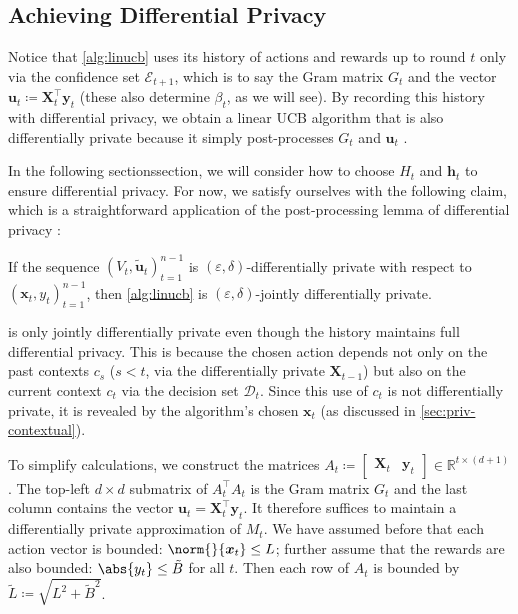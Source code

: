 \documentclass{article}
\renewcommand{\vec}[1]{\bm{#1}}
\newcommand{\defeq}{\coloneq}
\newcommand{\Real}{\mathds{R}}
\DeclarePairedDelimiter{\abs}||
\newcommand{\E}{\mathcal{E}}
\providecommand\transp{\top}
\let\transpsymbol\transp
\renewcommand{\transp}[1]{#1^\transpsymbol}
\newcommand{\Dset}[1]{\mathcal{D}_{#1}}
\newcommand{\XtX}[1]{\transp{#1}{#1}}
\begin{document}
\subsection{Achieving Differential Privacy}
\label{sec:alg-dp}


Notice that \cref{alg:linucb} uses its history of actions and rewards
up to round $t$ only via the confidence set $\E_{t+1}$, which is to
say the Gram matrix $G_t$ and the vector
$\vec u_t \defeq \transp{\vec X_t} \vec y_t$ (these also determine
$\beta_t$, as we will see).  By recording this history with
differential privacy, we obtain a linear UCB algorithm that is also
differentially private because it simply post-processes $G_t$ and
$\vec u_t$
\citep[see][Proposition~2.1]{DworkAlgorithmicFoundationsDifferential2014}.

In the following sectionssection, we will consider how to choose $H_t$ and
$\vec h_t$ to ensure differential privacy.  For now, we satisfy
ourselves with the following claim, which is a straightforward
application of the post-processing lemma of differential privacy
\citep[Proposition~2.1]{DworkAlgorithmicFoundationsDifferential2014}:
\begin{claim}
  If the sequence $(V_t,\tilde{\vec u}_t)_{t=1}^{n-1}$ is
  $(\varepsilon,\delta)$-differentially private with respect to
  $(\vec x_t, y_t)_{t=1}^{n-1}$, then \cref{alg:linucb} is
  $(\varepsilon,\delta)$-jointly differentially private.
\end{claim}

\begin{remark}
   is only jointly differentially private even though
  the history maintains full differential privacy.  This is because
  the chosen action depends not only on the past contexts $c_s$
  ($s < t$, via the differentially private $\vec X_{t-1}$) but also
  on the current context $c_t$ via the decision set $\Dset{t}$.  Since
  this use of $c_t$ is not differentially private, it is revealed by
  the algorithm's chosen $\vec x_t$ (as discussed in
  \cref{sec:priv-contextual}).
\end{remark}

To simplify calculations, we construct the matrices
$A_t \defeq \begin{bmatrix} \vec X_t & \vec y_t \end{bmatrix} \in
\Real^{t\times(d+1)}$.  The top-left $d\times d$ submatrix of
$\XtX{A_t}$ is the Gram matrix $G_t$ and the last column contains the
vector $\vec u_t = \transp{\vec X_t}\vec y_t$.  It therefore suffices
to maintain a differentially private approximation of $M_t$.  We have
assumed before that each action vector is bounded:
$\norm{}{\vec x_t} \le L$; further assume that the rewards are also
bounded: $\abs{y_t} \le \tilde B$ for all $t$.  Then each row of $A_t$
is bounded by $\tilde L \defeq \sqrt{L^2 + \tilde B^2}$.
\end{document}
